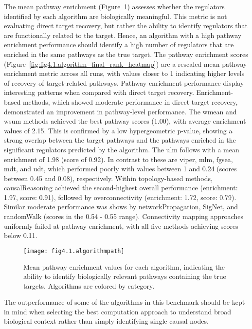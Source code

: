 The mean pathway enrichment (Figure~\ref{fig:fig4.1.algorithmpath}) assesses whether the regulators identified by each algorithm are biologically meaningful. This metric is not evaluating direct target recovery, but rather the ability to identify regulators that are functionally related to the target. Hence, an algorithm with a high pathway enrichment performance should identify a high number of regulators that are enriched in the same pathways as the true target. The pathway enrichment scores (Figure~\ref{fig:fig4.1.algorithm_final_rank_heatmap}) are a rescaled mean pathway enrichment metric across all runs, with values closer to 1 indicating higher levels of recovery of target-related pathways. Pathway enrichment performance display interesting patterns when compared with direct target recovery. Enrichment-based methods, which showed moderate performance in direct target recovery, demonstrated an improvement in pathway-level performance. The wmean and wsum methods achieved the best pathway scores (1.00), with average enrichment values of 2.15. This is confirmed by a low hypergeometric p-value, showing a strong overlap between the target pathways and the pathways enriched in the significant regulators predicted by the algorithm. The ulm follows with a mean enrichment of 1.98 (score of 0.92). In contrast to these are viper, mlm, fgsea, mdt, and udt, which performed poorly with values between 1 and 0.24 (scores between 0.45 and 0.08), respectively. Within topology-based methods, causalReasoning achieved the second-highest overall performance (enrichment: 1.97, score: 0.91), followed by overconnectivity (enrichment: 1.72, score: 0.79). Similar moderate performance was shows by networkPropagation, SigNet, and randomWalk (scores in the 0.54 - 0.55 range). Connectivity mapping approaches uniformly failed at pathway enrichment, with all five methods achieving scores below 0.11.

\begin{figure}[htbp]
    \centering
    \texttt{[image: fig4.1.algorithmpath]}
    \caption[Mean pathway enrichment values for each algorithm.]{Mean pathway enrichment values for each algorithm, indicating the ability to identify biologically relevant pathways containing the true targets. Algorithms are colored by category.}
    \label{fig:fig4.1.algorithmpath}
\end{figure}


The outperformance of some of the algorithms in this benchmark should be kept in mind when selecting the best computation approach to understand broad biological context rather than simply identifying single causal nodes. 

